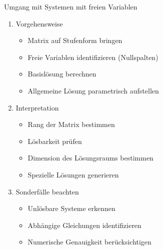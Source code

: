 \begin{KR}{Umgang mit Systemen mit freien Variablen}
\begin{enumerate}
    \item Vorgehensweise
    \begin{itemize}
        \item Matrix auf Stufenform bringen
        \item Freie Variablen identifizieren (Nullspalten)
        \item Basislösung berechnen
        \item Allgemeine Lösung parametrisch aufstellen
    \end{itemize}
    
    \item Interpretation
    \begin{itemize}
        \item Rang der Matrix bestimmen
        \item Lösbarkeit prüfen
        \item Dimension des Lösungsraums bestimmen
        \item Spezielle Lösungen generieren
    \end{itemize}
    
    \item Sonderfälle beachten
    \begin{itemize}
        \item Unlösbare Systeme erkennen
        \item Abhängige Gleichungen identifizieren
        \item Numerische Genauigkeit berücksichtigen
    \end{itemize}
\end{enumerate}
\end{KR}

